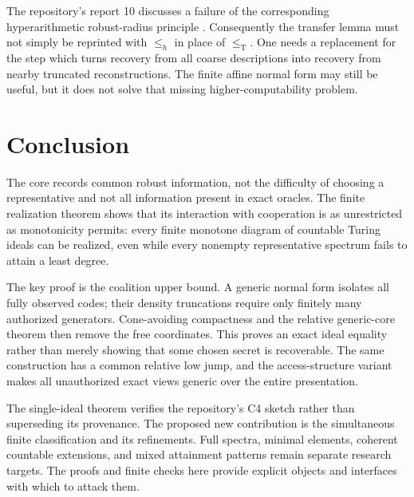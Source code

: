 \documentclass[11pt,letterpaper]{article}
\theoremstyle{plain}
\theoremstyle{definition}
\theoremstyle{remark}
\numberwithin{equation}{section}
\newcommand{\leT}{\leq_{\mathrm T}}
\begin{document}
The repository's report 10 discusses a failure of the corresponding
hyperarithmetic robust-radius principle \cite{RepoHyper}. Consequently the
transfer lemma must not simply be reprinted with $\leq_h$ in place of
$\leT$. One needs a replacement for the step which turns recovery from all
coarse descriptions into recovery from nearby truncated reconstructions.
The finite affine normal form may still be useful, but it does not solve
that missing higher-computability problem.

\section{Conclusion}\label{cr11:sec:conclusion}

The core records common robust information, not the difficulty of choosing
a representative and not all information present in exact oracles.
The finite realization theorem shows that its interaction with cooperation
is as unrestricted as monotonicity permits: every finite monotone diagram
of countable Turing ideals can be realized, even while every nonempty
representative spectrum fails to attain a least degree.

The key proof is the coalition upper bound. A generic normal form isolates
all fully observed codes; their density truncations require only finitely
many authorized generators. Cone-avoiding compactness and the relative
generic-core theorem then remove the free coordinates. This proves an
exact ideal equality rather than merely showing that some chosen secret
is recoverable. The same construction has a common relative low jump,
and the access-structure variant makes all unauthorized exact views generic
over the entire presentation.

The single-ideal theorem verifies the repository's C4 sketch rather than
superseding its provenance. The proposed new contribution is the
simultaneous finite classification and its refinements. Full spectra,
minimal elements, coherent countable extensions, and mixed attainment
patterns remain separate research targets. The proofs and finite checks
here provide explicit objects and interfaces with which to attack them.

\appendix
\end{document}
